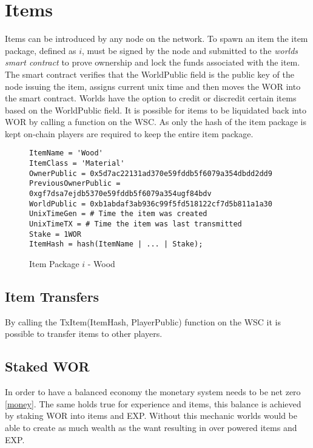 \documentclass[runningheads,a4paper]{llncs}
\begin{document}
\section{Items} 
\label{items}
Items can be introduced by any node on the network. To spawn an item the item package, defined as $i$, must be signed by the node and submitted to the \textit{worlds smart contract} to prove ownership and lock the funds associated with the item. The smart contract verifies that the WorldPublic field is the public key of the node issuing the item, assigns current unix time and then moves the WOR into the smart contract. Worlds have the option to credit or discredit certain items based on the WorldPublic field.  It is possible for items to be liquidated back into WOR by calling a function on the WSC. As only the hash of the item package is kept on-chain players are required to keep the entire item package.

\begin{figure}[H]
\centering
\label{itempkg}
\caption{Item Package $i$ - Wood}
\begin{lstlisting}
ItemName = 'Wood'
ItemClass = 'Material'
OwnerPublic = 0x5d7ac22131ad370e59fddb5f6079a354dbdd2dd9
PreviousOwnerPublic = 0xgf7dsa7ejdb5370e59fddb5f6079a354ugf84bdv
WorldPublic = 0xb1abdaf3ab936c99f5fd518122cf7d5b811a1a30
UnixTimeGen = # Time the item was created
UnixTimeTX = # Time the item was last transmitted
Stake = 1WOR
ItemHash = hash(ItemName | ... | Stake);
\end{lstlisting}
\end{figure}

\subsection{Item Transfers}
By calling the TxItem(ItemHash, PlayerPublic) function on the WSC it is possible to transfer items to other players.

\subsection{Staked WOR}
In order to have a balanced economy the monetary system needs to be net zero \ref{money}. The same holds true for experience and items, this balance is achieved by staking WOR into items and EXP. Without this mechanic worlds would be able to create as much wealth as the want resulting in over powered items and EXP.
\end{document}
